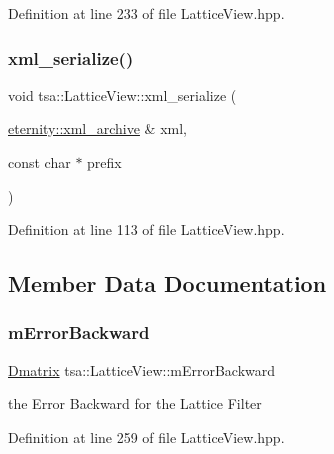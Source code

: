 Definition at line 233 of file Lattice\+View.\+hpp.

\mbox{\label{classtsa_1_1_lattice_view_a9040c52c4481b0e47346aa39f150c3b2}} 
\subsubsection{\texorpdfstring{xml\+\_\+serialize()}{xml\_serialize()}}
{\footnotesize\ttfamily void tsa\+::\+Lattice\+View\+::xml\+\_\+serialize (\begin{DoxyParamCaption}\item[{\hyperlink{classeternity_1_1xml__archive}{eternity\+::xml\+\_\+archive} \&}]{xml,  }\item[{const char $\ast$}]{prefix }\end{DoxyParamCaption})\hspace{0.3cm}{\ttfamily [inline]}}



Definition at line 113 of file Lattice\+View.\+hpp.



\subsection{Member Data Documentation}
\mbox{\label{classtsa_1_1_lattice_view_a9bbdb82e6aee17385ed9cd45da26c6ea}} 
\subsubsection{\texorpdfstring{m\+Error\+Backward}{mErrorBackward}}
{\footnotesize\ttfamily \hyperlink{namespacetsa_ad260cd21c1891c4ed391fe788569aba4}{Dmatrix} tsa\+::\+Lattice\+View\+::m\+Error\+Backward\hspace{0.3cm}{\ttfamily [private]}}



the Error Backward for the Lattice Filter 



Definition at line 259 of file Lattice\+View.\+hpp.

